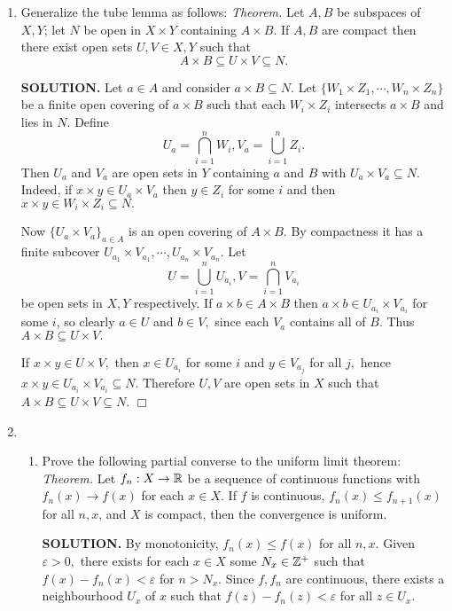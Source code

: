 \documentclass{article}
\begin{document}
\begin{enumerate}
    \item Generalize the tube lemma as follows: {\it Theorem.} Let $A, B$ be subspaces of $X, Y$; let $N$ be open in $X \times Y$ containing $A \times B.$ If $A, B$ are compact then there exist open sets $U, V \in X, Y$ such that
    $$A \times B \subseteq U \times V \subseteq N.$$

    {\bf SOLUTION.} Let $a \in A$ and consider $a \times B \subseteq N$. Let $\{W_1 \times Z_1, \cdots, W_n \times Z_n\}$ be a finite open covering of $a \times B$ such that each $W_i \times Z_i$ intersects $a \times B$ and lies in $N.$ Define
    $$U_a = \bigcap_{i=1}^n W_i, V_a = \bigcup_{i=1}^n Z_i.$$
    Then $U_a$ and $V_a$ are open sets in $Y$ containing $a$ and $B$ with $U_a \times V_a \subseteq N.$ Indeed, if $x \times y \in U_a \times V_a$ then $y \in Z_i$ for some $i$ and then $x \times y \in W_i \times Z_i \subseteq N.$

    Now $\{U_a \times V_a\}_{a \in A}$ is an open covering of $A \times B.$ By compactness it has a finite subcover $U_{a_1} \times V_{a_1}, \cdots, U_{a_n} \times V_{a_n}$. Let
    $$U = \bigcup_{i=1}^n U_{a_i}, V = \bigcap_{i=1}^n V_{a_i}$$
    be open sets in $X, Y$ respectively. If $a \times b \in A \times B$ then $a \times b \in U_{a_i} \times V_{a_i}$ for some $i$, so clearly $a \in U$ and $b \in V,$ since each $V_a$ contains all of $B.$ Thus $A \times B \subseteq U \times V.$

    If $x \times y \in U \times V,$ then $x \in U_{a_i}$ for some $i$ and $y \in V_{a_j}$ for all $j,$ hence $x \times y \in U_{a_i} \times V_{a_i} \subseteq N.$ Therefore $U, V$ are open sets in $X$ such that $A \times B \subseteq U \times V \subseteq N.$ $\Box$

    \item \begin{enumerate}
        \item Prove the following partial converse to the uniform limit theorem: {\it Theorem.} Let $f_n: X \rightarrow \mathbb{R}$ be a sequence of continuous functions with $f_n(x) \rightarrow f(x)$ for each $x \in X.$ If $f$ is continuous, $f_n(x) \leq f_{n+1}(x)$ for all $n, x$, and $X$ is compact, then the convergence is uniform.

        {\bf SOLUTION.} By monotonicity, $f_n(x) \leq f(x)$ for all $n, x.$ Given $\varepsilon > 0,$ there exists for each $x \in X$ some $N_x \in \mathbb{Z}^+$ such that $f(x) - f_n(x) < \varepsilon$ for $n > N_x.$ Since $f, f_n$ are continuous, there exists a neighbourhood $U_x$ of $x$ such that $f(z) - f_n(z) < \varepsilon$ for all $z \in U_x.$


\end{enumerate}
\end{enumerate}
\end{document}
